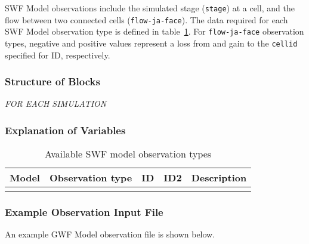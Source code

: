 
SWF Model observations include the simulated stage (\texttt{stage}) at a cell, and the flow between two connected cells (\texttt{flow-ja-face}). The data required for each SWF Model observation type is defined in table~\ref{table:swfobstype}. For \texttt{flow-ja-face} observation types, negative and positive values represent a loss from and gain to the \texttt{cellid} specified for ID, respectively.

\subsubsection{Structure of Blocks}
\vspace{5mm}

\noindent \textit{FOR EACH SIMULATION}



\subsubsection{Explanation of Variables}
\begin{description}

\end{description}


\begin{longtable}{p{2cm} p{2.75cm} p{2cm} p{1.25cm} p{7cm}}
\caption{Available SWF model observation types} \tabularnewline

\hline
\hline
\textbf{Model} & \textbf{Observation type} & \textbf{ID} & \textbf{ID2} & \textbf{Description} \\
\hline
\endhead

\hline
\endfoot


\label{table:swfobstype}
\end{longtable}

\vspace{5mm}
\subsubsection{Example Observation Input File}

An example GWF Model observation file is shown below.



